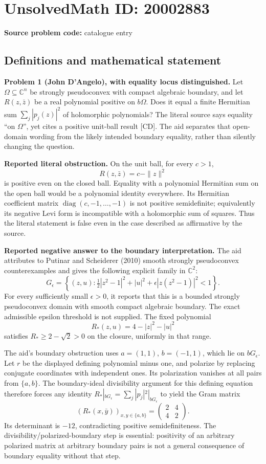 \documentclass[11pt]{article}
\newcommand{\C}{\mathbb{C}}
\begin{document}
\section*{UnsolvedMath ID: 20002883}
\textbf{Source problem code:} catalogue entry
\subsection{Definitions and mathematical statement}
\textbf{Problem 1 (John D'Angelo), with equality locus distinguished.} Let \(\Omega\subseteq\C^n\) be strongly pseudoconvex with compact algebraic boundary, and let \(R(z,\bar z)\) be a real polynomial positive on \(b\Omega\). Does it equal a finite Hermitian sum \(\sum_j|p_j(z)|^2\) of holomorphic polynomials? The literal source says equality ``on \(\Omega\)'', yet cites a positive unit-ball result [CD]. The aid separates that open-domain wording from the likely intended boundary equality, rather than silently changing the question.

\textbf{Reported literal obstruction.} On the unit ball, for every \(c>1\),
\[
 R(z,\bar z)=c-\|z\|^2
\]
is positive even on the closed ball. Equality with a polynomial Hermitian sum on the open ball would be a polynomial identity everywhere. Its Hermitian coefficient matrix \(\operatorname{diag}(c,-1,\ldots,-1)\) is not positive semidefinite; equivalently its negative Levi form is incompatible with a holomorphic sum of squares. Thus the literal statement is false even in the case described as affirmative by the source.

\textbf{Reported negative answer to the boundary interpretation.} The aid attributes to Putinar and Scheiderer (2010) smooth strongly pseudoconvex counterexamples and gives the following explicit family in \(\C^2\):
\[
 G_\epsilon=\left\{(z,u):
 \tfrac12|z^2-1|^2+|u|^2+
 \epsilon|z(z^2-1)|^2<1\right\}.
\]
For every sufficiently small \(\epsilon>0\), it reports that this is a bounded strongly pseudoconvex domain with smooth compact algebraic boundary. The exact admissible epsilon threshold is not supplied. The fixed polynomial
\[
 R_*(z,u)=4-|z|^2-|u|^2
\]
satisfies \(R_*\geq2-\sqrt2>0\) on the closure, uniformly in that range.

The aid's boundary obstruction uses \(a=(1,1)\), \(b=(-1,1)\), which lie on \(bG_\epsilon\). Let \(r\) be the displayed defining polynomial minus one, and polarize by replacing conjugate coordinates with independent ones. Its polarization vanishes at all pairs from \(\{a,b\}\). The boundary-ideal divisibility argument for this defining equation therefore forces any identity \(R_*|_{bG_\epsilon}=\sum_j|p_j|^2|_{bG_\epsilon}\) to yield the Gram matrix
\[
 \left(R_*(x,\bar y)\right)_{x,y\in\{a,b\}}
 =\begin{pmatrix}2&4\\4&2\end{pmatrix}.
\]
Its determinant is \(-12\), contradicting positive semidefiniteness. The divisibility/polarized-boundary step is essential: positivity of an arbitrary polarized matrix at arbitrary boundary pairs is not a general consequence of boundary equality without that step.
\end{document}
